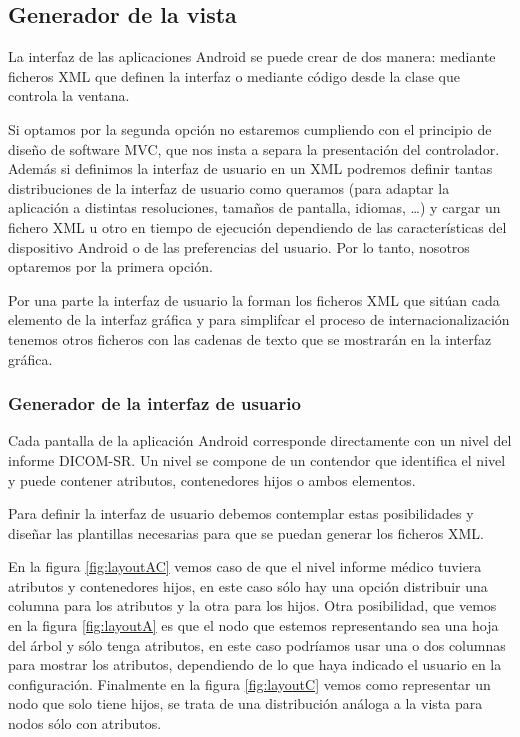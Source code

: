 \subsection{Generador de la vista}
La interfaz de las aplicaciones Android se puede crear de dos manera: mediante ficheros XML que definen la interfaz o mediante código desde la clase que controla la ventana.\par
Si optamos por la segunda opción no estaremos cumpliendo con el principio de diseño de software MVC, que nos insta a separa la presentación del controlador. Además si definimos la interfaz de usuario en un XML podremos definir tantas distribuciones de la interfaz de usuario como queramos (para adaptar la aplicación a distintas resoluciones, tamaños de pantalla, idiomas, \ldots) y cargar un fichero XML u otro en tiempo de ejecución dependiendo de las características del dispositivo Android o de las preferencias del usuario. Por lo tanto, nosotros optaremos por la primera opción.\medskip \par
Por una parte la interfaz de usuario la forman los ficheros XML que sitúan cada elemento de la interfaz gráfica y para simplifcar el proceso de internacionalización tenemos otros ficheros con las cadenas de texto que se mostrarán en la interfaz gráfica.\par

\subsubsection{Generador de la interfaz de usuario}\label{vista:ui}
Cada pantalla de la aplicación Android corresponde directamente con un nivel del informe DICOM-SR. Un nivel se compone de un contendor que identifica el nivel y puede contener atributos, contenedores hijos o ambos elementos.\par
Para definir la interfaz de usuario debemos contemplar estas posibilidades y diseñar las plantillas necesarias para que se puedan generar los ficheros XML.\par
En la figura \ref{fig:layoutAC} vemos caso de que el nivel informe médico tuviera atributos y contenedores hijos, en este caso sólo hay una opción distribuir una columna para los atributos y la otra para los hijos. Otra posibilidad, que vemos en la figura \ref{fig:layoutA} es que el nodo que estemos representando sea una hoja del árbol y sólo tenga atributos, en este caso podríamos usar una o dos columnas para mostrar los atributos, dependiendo de lo que haya indicado el usuario en la configuración. Finalmente en la figura \ref{fig:layoutC} vemos como representar un nodo que solo tiene hijos, se trata de una distribución análoga a la vista para nodos sólo con atributos.\medskip\par

